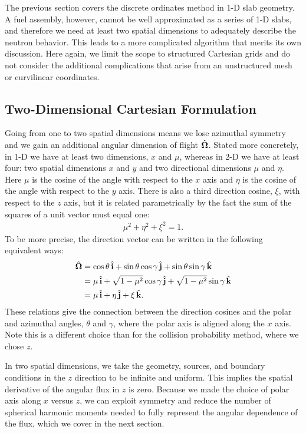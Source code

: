 The previous section covers the discrete ordinates method in 1-D slab geometry. A fuel assembly, however, cannot be well approximated as a series of 1-D slabs, and therefore we need at least two spatial dimensions to adequately describe the neutron behavior. This leads to a more complicated algorithm that merits its own discussion. Here again, we limit the scope to structured Cartesian grids and do not consider the additional complications that arise from an unstructured mesh or curvilinear coordinates.



\subsection{Two-Dimensional Cartesian Formulation}

Going from one to two spatial dimensions means we lose azimuthal symmetry and we gain an additional angular dimension of flight $\hat{\mathbf{\Omega}}$. Stated more concretely, in 1-D we have at least two dimensions, $x$ and $\mu$, whereas in 2-D we have at least four: two spatial dimensions $x$ and $y$ and two directional dimensions $\mu$ and $\eta$. Here $\mu$ is the cosine of the angle with respect to the $x$ axis and $\eta$ is the cosine of the angle with respect to the $y$ axis. There is also a third direction cosine, $\xi$, with respect to the $z$ axis, but it is related parametrically by the fact the sum of the squares of a unit vector must equal one:
\begin{align}
  \mu^2 + \eta^2 + \xi^2 = 1.
\end{align}
To be more precise, the direction vector can be written in the following equivalent ways:
\begin{align}
  \hat{\mathbf{\Omega}} 
  &= \cos\theta \, \hat{\mathbf{i}} 	+ \sin\theta \cos\gamma \, \hat{\mathbf{j}} 			+ \sin\theta 		 \sin\gamma \, \hat{\mathbf{k}} \nonumber \\
  &= \mu \, \hat{\mathbf{i}} 			+ \sqrt{ 1 - \mu^2 } \cos\gamma \, \hat{\mathbf{j}} 	+ \sqrt{ 1 - \mu^2 } \sin\gamma \, \hat{\mathbf{k}} \nonumber \\
  &= \mu \, \hat{\mathbf{i}} + \eta \, \hat{\mathbf{j}} + \xi \, \hat{\mathbf{k}} .
\end{align}
These relations give the connection between the direction cosines and the polar and azimuthal angles, $\theta$ and $\gamma$, where the polar axis is aligned along the $x$ axis. Note this is a different choice than for the collision probability method, where we chose $z$.

In two spatial dimensions, we take the geometry, sources, and boundary conditions in the $z$ direction to be infinite and uniform. This implies the spatial derivative of the angular flux in $z$ is zero. Because we made the choice of polar axis along $x$ versus $z$, we can exploit symmetry and reduce the number of spherical harmonic moments needed to fully represent the angular dependence of the flux, which we cover in the next section.

